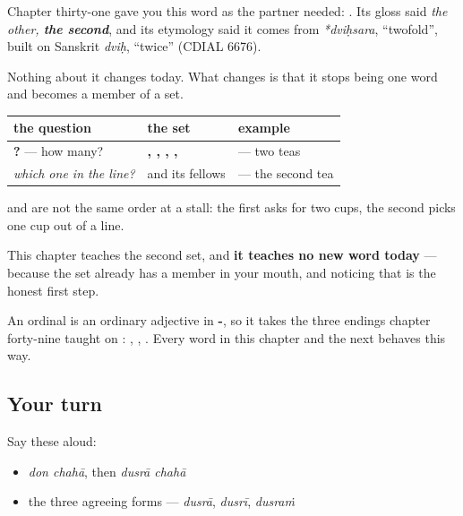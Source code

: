 Chapter thirty-one gave you this word as the partner \textbf{} needed: \textbf{    }. Its gloss said \emph{the other, \textbf{the second}}, and its etymology said it comes from \emph{*dviḥsara}, \textquotedblleft{}twofold\textquotedblright{}, built on Sanskrit \emph{dviḥ}, \textquotedblleft{}twice\textquotedblright{} (CDIAL 6676).

Nothing about it changes today. What changes is that it stops being one word and becomes a member of a set.

\begin{grammarlens}[title={Grammar Lens: two sets of number words, not one}]
\noindent
\begin{tabularx}{\linewidth}{@{}>{\raggedright\arraybackslash}X>{\raggedright\arraybackslash}X>{\raggedright\arraybackslash}X@{}}
\toprule
\textbf{the question} & \textbf{the set} & \textbf{example} \\
\midrule
\textbf{\mr{किती}?} — how many? & \textbf{\mr{एक}, \mr{दोन}, \mr{तीन}, \mr{चार}, \mr{पाच}} & \textbf{\mr{दोन} \mr{चहा}} — two teas \\
\emph{which one in the line?} & \textbf{\mr{दुसरा}} and its fellows & \textbf{\mr{दुसरा} \mr{चहा}} — the second tea \\
\bottomrule
\end{tabularx}

\textbf{ } and \textbf{ } are not the same order at a stall: the first asks for two cups, the second picks one cup out of a line.

This chapter teaches the second set, and \textbf{it teaches no new word today} — because the set already has a member in your mouth, and noticing that is the honest first step.

An ordinal is an ordinary adjective in \textbf{-}, so it takes the three endings chapter forty-nine taught on \textbf{}: \textbf{}, \textbf{}, \textbf{}. Every word in this chapter and the next behaves this way.
\end{grammarlens}

\subsection*{Your turn}
Say these aloud:

\begin{itemize}
\raggedright
  \item \emph{don chahā}, then \emph{dusrā chahā}
  \item the three agreeing forms — \emph{dusrā}, \emph{dusrī}, \emph{dusraṁ}
\end{itemize}

